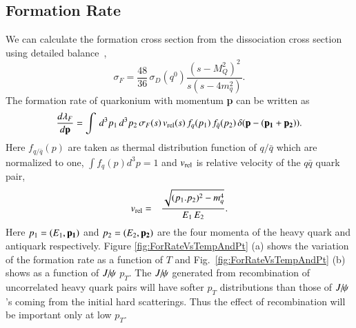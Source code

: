 {  \subsection{Formation Rate}
  We can calculate the formation cross section from the dissociation cross section using detailed balance~\cite{Thews:2000rj,Thews:2005vj},
  \begin{equation}
    \sigma_{F} = \frac{48}{36}\,\sigma_{D}(q^0)\frac{(s-M_{Q}^2)^{2}}{s(s-4m_q^{2})}.
  \end{equation}
  The formation rate of quarkonium with momentum {\bf p} can be written as
  \begin{equation}
    \frac{d\lambda_{F}}{d{\rm\bf p}} = \int \,d^{3}p_1 \,d^{3}p_2 \,\sigma_{F}(s)\, v_{\rm rel}(s)\,f_{q}(p_1)\, f_{\bar{q}} (p_2)\,\delta({\rm\bf p}-( {\rm\bf p_1} + {\rm\bf p_2} )).
  \end{equation}
  Here $f_{q/\bar{q}}(p)$ are taken as thermal distribution function of  $q/\bar{q}$ which are 
  normalized to one, $\int f_{q}(p) d^{3}p  = 1 $ and $v_{\rm rel}$ is relative velocity of the
  $q\bar{q}$ quark pair,
  \begin{eqnarray}
    v_{\rm rel} &=& {\sqrt{(p_{1}.p_{2})^{2} - m_q^{4} } \over E_{1} \, E_{2}}. %
  \end{eqnarray}
  Here $p_1 = (E_1,{\bf p_{1}})$ and $p_{2} = (E_{2},{\bf p_{2}})$ are the four momenta of the heavy quark and 
  antiquark respectively.
  Figure \ref{fig:ForRateVsTempAndPt} (a) shows the variation of the formation rate as a function 
  of $T$ and Fig.~\ref{fig:ForRateVsTempAndPt} (b) shows as a function of $J\hspace{-.08em}/\hspace{-.14em}\psi$ $p_T$.
  The $J\hspace{-.08em}/\hspace{-.14em}\psi$ generated from recombination of uncorrelated heavy quark pairs will have 
  softer $p_{T}$ distributions than those of $J\hspace{-.08em}/\hspace{-.14em}\psi$'s coming from the initial hard scatterings.
  Thus the effect of recombination will be important only at low $p_T$.
  
}
